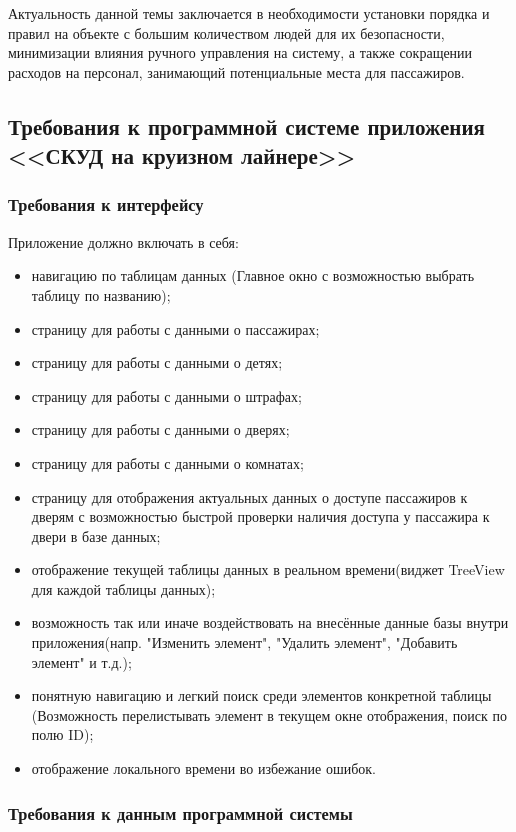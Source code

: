 Актуальность данной темы заключается в необходимости установки порядка и правил на объекте с большим количеством людей для их безопасности, минимизации влияния ручного управления на систему, а также сокращении расходов на персонал, занимающий потенциальные места для пассажиров.

\subsection{Требования к программной системе приложения <<СКУД на круизном лайнере>>}
\subsubsection{Требования к интерфейсу}

Приложение должно включать в себя:
\begin{itemize}
	\item навигацию по таблицам данных (Главное окно с возможностью выбрать таблицу по названию);
	\item страницу для работы с данными о пассажирах;
	\item страницу для работы с данными о детях;
	\item страницу для работы с данными о штрафах;
	\item страницу для работы с данными о дверях;
	\item страницу для работы с данными о комнатах;
	\item страницу для отображения актуальных данных о доступе пассажиров к дверям с возможностью быстрой проверки наличия доступа у пассажира к двери в базе данных;
	\item отображение текущей таблицы данных в реальном времени(виджет TreeView для каждой таблицы данных);
	\item возможность так или иначе воздействовать на внесённые данные базы внутри приложения(напр. "Изменить элемент", "Удалить элемент", "Добавить элемент" и т.д.);
	\item понятную навигацию и легкий поиск среди элементов конкретной таблицы (Возможность перелистывать элемент в текущем окне отображения, поиск по полю ID);
	\item отображение локального времени во избежание ошибок.
\end{itemize}

\subsubsection{Требования к данным программной системы}

